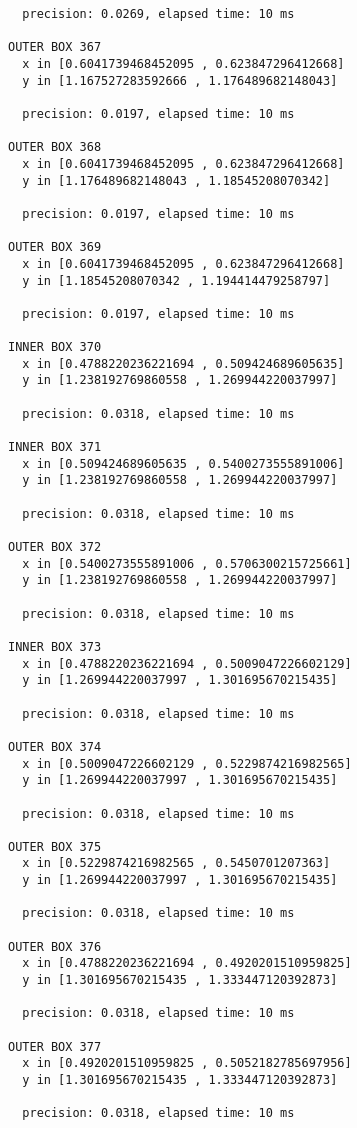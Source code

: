 \begin{verbatim}
  precision: 0.0269, elapsed time: 10 ms

OUTER BOX 367
  x in [0.6041739468452095 , 0.623847296412668]
  y in [1.167527283592666 , 1.176489682148043]

  precision: 0.0197, elapsed time: 10 ms

OUTER BOX 368
  x in [0.6041739468452095 , 0.623847296412668]
  y in [1.176489682148043 , 1.18545208070342]

  precision: 0.0197, elapsed time: 10 ms

OUTER BOX 369
  x in [0.6041739468452095 , 0.623847296412668]
  y in [1.18545208070342 , 1.194414479258797]

  precision: 0.0197, elapsed time: 10 ms

INNER BOX 370
  x in [0.4788220236221694 , 0.509424689605635]
  y in [1.238192769860558 , 1.269944220037997]

  precision: 0.0318, elapsed time: 10 ms

INNER BOX 371
  x in [0.509424689605635 , 0.5400273555891006]
  y in [1.238192769860558 , 1.269944220037997]

  precision: 0.0318, elapsed time: 10 ms

OUTER BOX 372
  x in [0.5400273555891006 , 0.5706300215725661]
  y in [1.238192769860558 , 1.269944220037997]

  precision: 0.0318, elapsed time: 10 ms

INNER BOX 373
  x in [0.4788220236221694 , 0.5009047226602129]
  y in [1.269944220037997 , 1.301695670215435]

  precision: 0.0318, elapsed time: 10 ms

OUTER BOX 374
  x in [0.5009047226602129 , 0.5229874216982565]
  y in [1.269944220037997 , 1.301695670215435]

  precision: 0.0318, elapsed time: 10 ms

OUTER BOX 375
  x in [0.5229874216982565 , 0.5450701207363]
  y in [1.269944220037997 , 1.301695670215435]

  precision: 0.0318, elapsed time: 10 ms

OUTER BOX 376
  x in [0.4788220236221694 , 0.4920201510959825]
  y in [1.301695670215435 , 1.333447120392873]

  precision: 0.0318, elapsed time: 10 ms

OUTER BOX 377
  x in [0.4920201510959825 , 0.5052182785697956]
  y in [1.301695670215435 , 1.333447120392873]

  precision: 0.0318, elapsed time: 10 ms


\end{verbatim}
